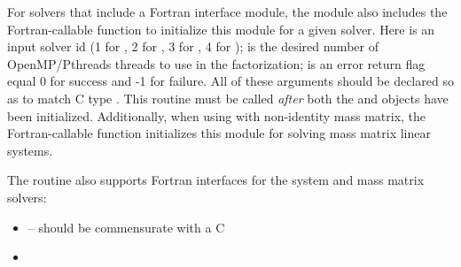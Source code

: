 For solvers that include a Fortran interface module, the
{\sunlinsolslumt} module also includes the Fortran-callable
function  to initialize this
{\sunlinsolslumt} module for a given {\sundials} solver.  Here 
is an input solver id (1 for {\cvode}, 2 for {\ida}, 3 for {\kinsol},
4 for {\arkode});  is the desired number of
OpenMP/Pthreads threads to use in the factorization;  is an
error return flag equal 0 for success and -1 for failure.  All of
these arguments should be declared so as to match C type .
This routine must be called \emph{after} both the {\nvector} and
{\sunmatrix} objects have been initialized.  Additionally, when using
{\arkode} with non-identity mass matrix, the Fortran-callable function
 initializes this
{\sunlinsolslumt} module for solving mass matrix linear systems.

The  routine also supports Fortran
interfaces for the system and mass matrix solvers:
\begin{itemize}
\item {} -- 
  should be commensurate with a C 
\item {}
\end{itemize}
